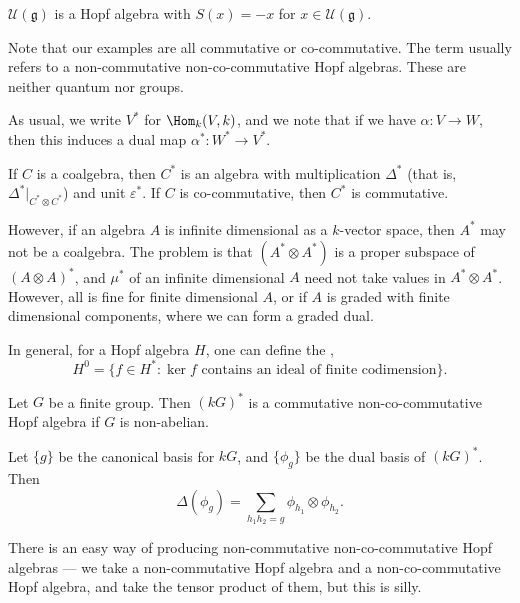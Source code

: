 \documentclass[a4paper]{article}
\begin{document}
\begin{eg}
  $\mathcal{U}(\mathfrak{g})$ is a Hopf algebra with $S(x) = -x$ for $x \in \mathcal{U}(\mathfrak{g})$.
\end{eg}


Note that our examples are all commutative or co-commutative. The term  usually refers to a non-commutative non-co-commutative Hopf algebras. These are neither quantum nor groups.

As usual, we write $V^*$ for $\Hom_k(V, k)$, and we note that if we have $\alpha: V \to W$, then this induces a dual map $\alpha^*: W^* \to V^*$.

\begin{lemma}
  If $C$ is a coalgebra, then $C^*$ is an algebra with multiplication $\Delta^*$ (that is, $\Delta^*|_{C^* \otimes C^*}$) and unit $\varepsilon^*$. If $C$ is co-commutative, then $C^*$ is commutative.
\end{lemma}

However, if an algebra $A$ is infinite dimensional as a $k$-vector space, then $A^*$ may not be a coalgebra. The problem is that $(A^* \otimes A^*)$ is a proper subspace of $(A \otimes A)^*$, and $\mu^*$ of an infinite dimensional $A$ need not take values in $A^* \otimes A^*$. However, all is fine for finite dimensional $A$, or if $A$ is graded with finite dimensional components, where we can form a graded dual.

In general, for a Hopf algebra $H$, one can define the ,
\[
  H^0 = \{f \in H^*: \ker f \text{ contains an ideal of finite codimension}\}.
\]
\begin{eg}
  Let $G$ be a finite group. Then $(kG)^*$ is a commutative non-co-commutative Hopf algebra if $G$ is non-abelian.

  Let $\{g\}$ be the canonical basis for $kG$, and $\{\phi_g\}$ be the dual basis of $(kG)^*$. Then
  \[
    \Delta(\phi_g) = \sum_{h_1 h_2 = g} \phi_{h_1} \otimes \phi_{h_2}.
  \]
\end{eg}
There is an easy way of producing non-commutative non-co-commutative Hopf algebras --- we take a non-commutative Hopf algebra and a non-co-commutative Hopf algebra, and take the tensor product of them, but this is silly.
\end{document}
